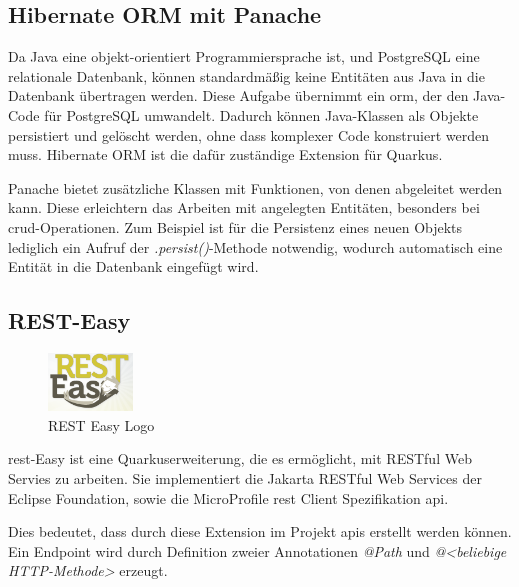 \subsection{Hibernate ORM mit Panache} 
Da Java eine objekt-orientiert Programmiersprache ist, und PostgreSQL eine relationale Datenbank, können standardmäßig keine Entitäten aus Java in die Datenbank übertragen werden. 
Diese Aufgabe übernimmt ein \gls{orm}, der den Java-Code für PostgreSQL umwandelt. 
Dadurch können Java-Klassen als Objekte persistiert und gelöscht werden, ohne dass komplexer Code konstruiert werden muss. 
Hibernate ORM ist die dafür zuständige Extension für Quarkus. 
\cite{ORMAbout}

Panache bietet zusätzliche Klassen mit Funktionen, von denen abgeleitet werden kann. 
Diese erleichtern das Arbeiten mit angelegten Entitäten, besonders bei \gls{crud}-Operationen.
Zum Beispiel ist für die Persistenz eines neuen Objekts lediglich ein Aufruf der \emph{.persist()}-Methode notwendig, wodurch automatisch eine Entität in die Datenbank eingefügt wird. 
\cite{HibernateORMwithPanache}

\subsection{REST-Easy}
\label{ch::resteasy}
\begin{figure}
    \begin{center}
        \includegraphics[width=0.2\textwidth]{pics/logos/resteasy.png}
        \caption{REST Easy Logo}
    \end{center}
\end{figure}
\gls{rest}-Easy ist eine Quarkuserweiterung, die es ermöglicht, mit RESTful Web Servies zu arbeiten. 
Sie implementiert die Jakarta RESTful Web Services der Eclipse Foundation, sowie die MicroProfile \gls{rest} Client Spezifikation \gls{api}.
\cite{ResteasyAbout}

Dies bedeutet, dass durch diese Extension im Projekt \gls{api}s erstellt werden können. 
Ein Endpoint wird durch Definition zweier Annotationen \emph{@Path} und \emph{@<beliebige HTTP-Methode>} erzeugt.
\cite{ResteasyExtensionAbout}

